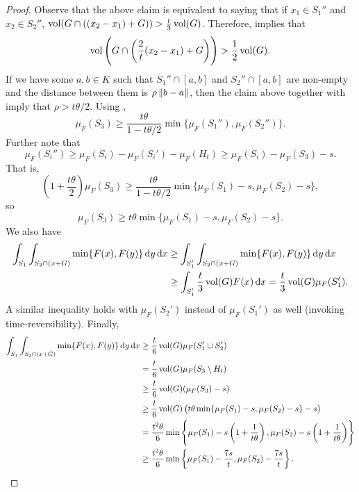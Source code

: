 \begin{proof}
	Observe that the above claim is equivalent to saying that if $x_1\in S_1''$ and $x_2\in S_2''$, $\operatorname{vol}(G\cap ((x_2-x_1) + G)) > \frac{t}{3}\operatorname{vol}(G)$. Therefore,  implies that
	\[ \operatorname{vol}\left(G\cap \left(\frac{2}{t}(x_2-x_1) + G\right)\right) > \frac{1}{2}\operatorname{vol}(G). \]
	If we have some $a,b\in K$ such that $S_1''\cap[a,b]$ and $S_2''\cap[a,b]$ are non-empty and the distance between them is $\rho\left\lVert b-a\right\rVert$, then the claim above together with  imply that $\rho>t\theta/2$. Using , %
	\[ \mu_F(S_3) \geq \frac{t\theta}{1-t\theta/2} \min\{\mu_F(S_1''), \mu_F(S_2'')\}. \]
	Further note that
	\[ \mu_F(S_i'') \geq \mu_F(S_i) - \mu_F(S_i') - \mu_F(H_t) \geq \mu_F(S_i) - \mu_F(S_3) - s. \]
	That is,
	\[ \left(1+\frac{t\theta}{2}\right) \mu_F(S_3) \geq \frac{t\theta}{1-t\theta/2} \min\{\mu_F(S_1)-s, \mu_F(S_2)-s\}, \]
	so
	\[ \mu_F(S_3) \geq t\theta \min\{\mu_F(S_1)-s, \mu_F(S_2)-s\}. \]
	We also have
	\begin{align*}
		\int_{S_1} \int_{S_2\cap (x+G)} \min\{F(x), F(y)\} \operatorname{d}\!{y}\operatorname{d}\!{x} &\geq \int_{S_1'} \int_{S_2\cap (x+G)} \min\{F(x),F(y)\} \operatorname{d}\!{y}\operatorname{d}\!{x} \\
			&\geq \int_{S_1'} \frac{t}{3} \operatorname{vol}(G) F(x) \operatorname{d}\!{x} = \frac{t}{3}\operatorname{vol}(G)\mu_F(S_1'). 
	\end{align*}
	A similar inequality holds with $\mu_F(S_2')$ instead of $\mu_F(S_1')$ as well (invoking time-reversibility). Finally,
	\begin{align*}
		\int_{S_1} \int_{S_2\cap (x+G)} \min\{F(x),F(y)\}\operatorname{d}\!{y}\operatorname{d}\!{x} &\geq \frac{t}{6}\operatorname{vol}(G)\mu_F(S_1'\cup S_2') \\
			&= \frac{t}{6}\operatorname{vol}(G)\mu_F(S_3\setminus H_t) \\
			&\geq \frac{t}{6}\operatorname{vol}(G)(\mu_F(S_3) - s) \\
			&\geq \frac{t}{6}\operatorname{vol}(G)\left(t\theta\min\{\mu_F(S_1)-s,\mu_F(S_2)-s\} - s\right) \\
			&= \frac{t^2\theta}{6}  \min\left\{\mu_F(S_1)-s\left(1+\frac{1}{t\theta}\right), \mu_F(S_2)-s\left(1+\frac{1}{t\theta}\right)\right\} \\
			&\geq \frac{t^2\theta}{6}  \min\left\{\mu_F(S_1)-\frac{7s}{t}, \mu_F(S_2)-\frac{7s}{t}\right\}.
	\end{align*}
\end{proof}

